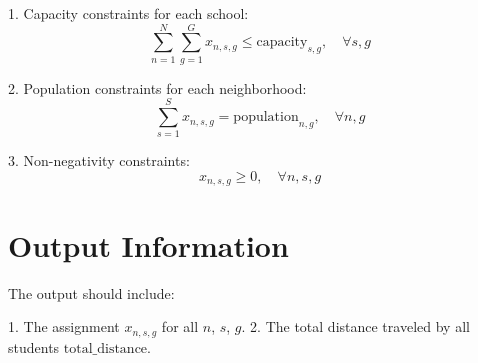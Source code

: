 \documentclass{article}
\begin{document}
1. Capacity constraints for each school:
\[
\sum_{n=1}^{N} \sum_{g=1}^{G} x_{n,s,g} \leq \text{capacity}_{s,g}, \quad \forall s, g
\]

2. Population constraints for each neighborhood:
\[
\sum_{s=1}^{S} x_{n,s,g} = \text{population}_{n,g}, \quad \forall n, g
\]

3. Non-negativity constraints:
\[
x_{n,s,g} \geq 0, \quad \forall n, s, g
\]

\section*{Output Information}

The output should include:

1. The assignment \( x_{n,s,g} \) for all \( n \), \( s \), \( g \).
2. The total distance traveled by all students \( \text{total\_distance} \).
\end{document}

